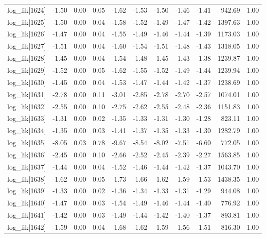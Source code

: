 \begin{table}[ht]
\begin{tabular}{rrrrrrrrrrr}
  log\_lik[1624] & -1.50 & 0.00 & 0.05 & -1.62 & -1.53 & -1.50 & -1.46 & -1.41 & 942.69 & 1.00 \\ 
  log\_lik[1625] & -1.50 & 0.00 & 0.04 & -1.58 & -1.52 & -1.49 & -1.47 & -1.42 & 1397.63 & 1.00 \\ 
  log\_lik[1626] & -1.47 & 0.00 & 0.04 & -1.55 & -1.49 & -1.46 & -1.44 & -1.39 & 1173.03 & 1.00 \\ 
  log\_lik[1627] & -1.51 & 0.00 & 0.04 & -1.60 & -1.54 & -1.51 & -1.48 & -1.43 & 1318.05 & 1.00 \\ 
  log\_lik[1628] & -1.45 & 0.00 & 0.04 & -1.54 & -1.48 & -1.45 & -1.43 & -1.38 & 1239.87 & 1.00 \\ 
  log\_lik[1629] & -1.52 & 0.00 & 0.05 & -1.62 & -1.55 & -1.52 & -1.49 & -1.44 & 1239.94 & 1.00 \\ 
  log\_lik[1630] & -1.45 & 0.00 & 0.04 & -1.53 & -1.47 & -1.44 & -1.42 & -1.37 & 1238.69 & 1.00 \\ 
  log\_lik[1631] & -2.78 & 0.00 & 0.11 & -3.01 & -2.85 & -2.78 & -2.70 & -2.57 & 1074.01 & 1.00 \\ 
  log\_lik[1632] & -2.55 & 0.00 & 0.10 & -2.75 & -2.62 & -2.55 & -2.48 & -2.36 & 1151.83 & 1.00 \\ 
  log\_lik[1633] & -1.31 & 0.00 & 0.02 & -1.35 & -1.33 & -1.31 & -1.30 & -1.28 & 823.11 & 1.00 \\ 
  log\_lik[1634] & -1.35 & 0.00 & 0.03 & -1.41 & -1.37 & -1.35 & -1.33 & -1.30 & 1282.79 & 1.00 \\ 
  log\_lik[1635] & -8.05 & 0.03 & 0.78 & -9.67 & -8.54 & -8.02 & -7.51 & -6.60 & 772.05 & 1.00 \\ 
  log\_lik[1636] & -2.45 & 0.00 & 0.10 & -2.66 & -2.52 & -2.45 & -2.39 & -2.27 & 1563.85 & 1.00 \\ 
  log\_lik[1637] & -1.44 & 0.00 & 0.04 & -1.52 & -1.46 & -1.44 & -1.42 & -1.37 & 1043.70 & 1.00 \\ 
  log\_lik[1638] & -1.62 & 0.00 & 0.05 & -1.73 & -1.66 & -1.62 & -1.59 & -1.53 & 1438.35 & 1.00 \\ 
  log\_lik[1639] & -1.33 & 0.00 & 0.02 & -1.36 & -1.34 & -1.33 & -1.31 & -1.29 & 944.08 & 1.00 \\ 
  log\_lik[1640] & -1.47 & 0.00 & 0.03 & -1.54 & -1.49 & -1.46 & -1.44 & -1.40 & 776.92 & 1.00 \\ 
  log\_lik[1641] & -1.42 & 0.00 & 0.03 & -1.49 & -1.44 & -1.42 & -1.40 & -1.37 & 893.81 & 1.00 \\ 
  log\_lik[1642] & -1.59 & 0.00 & 0.04 & -1.68 & -1.62 & -1.59 & -1.56 & -1.51 & 816.30 & 1.00 \\ 

\end{tabular}
\end{table}

